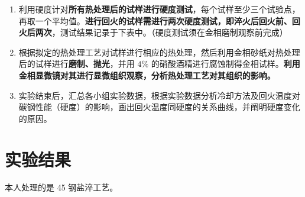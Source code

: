 \documentclass[a4paper,utf8]{article}
\begin{document}
\begin{enumerate}
\begin{enumerate}
        \end{enumerate}
        \item 利用硬度计对\textbf{所有热处理后的试样进行硬度测试}，每个试样至少三个试验点，再取一个平均值。\textbf{进行回火的试样需进行两次硬度测试，即淬火后回火前、回火后两次}，测试结果记录于下表中。（硬度测试须在金相磨制观察前完成）
        \item 根据拟定的热处理工艺对试样进行相应的热处理，然后利用金相砂纸对热处理后的试样进行\textbf{磨制、抛光}，并用 $4\%$ 的硝酸酒精进行腐蚀制得金相试样。\textbf{利用金相显微镜对其进行显微组织观察，分析热处理工艺对其组织的影响。}
        \item 实验结束后，汇总各小组实验数据，根据实验数据分析冷却方法及回火温度对碳钢性能（硬度）的影响，画出回火温度同硬度的关系曲线，并阐明硬度变化的原因。
    \end{enumerate}\newpage
\section{实验结果}
    本人处理的是 45 钢盐淬工艺。
\end{document}

